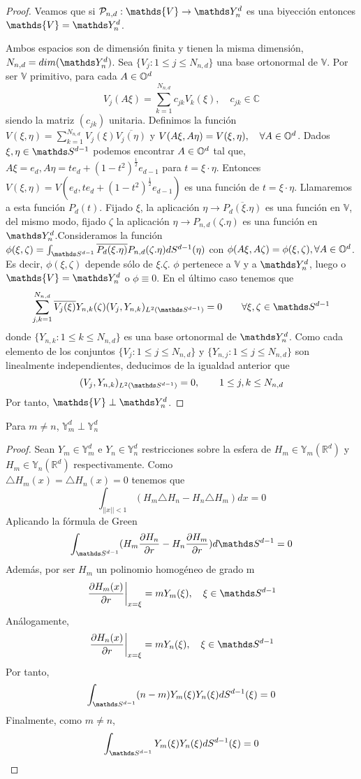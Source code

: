\begin{proof}
Veamos que si $\mathcal{P}_{n,d}:\mathds{V} \to \spharm$ es una biyección entonces\\ $\mathds{V}=\spharm$.
\medskip

Ambos espacios son de dimensión finita y tienen la misma dimensión, $N_{n,d}=dim(\spharm)$. Sea $\{V_j : 1 \le j \le N_{n,d} \}$ una base ortonormal de  $\mathds{V}$. Por ser $\mathds{V}$ primitivo, para cada $A\in\mathbb{O}^d$ $$
V_j(A\xi) = \sum_{k=1}^{N_{n,d}}c_{jk}V_k(\xi), \quad c_{jk}\in\mathds{C}$$ siendo la matriz $(c_{jk})$ unitaria. Definimos la función \\$V(\xi,\eta) = \sum_{k=1}^{N_{n,d}}V_j(\xi)\overline{V_j(\eta)}$
y $V(A\xi,A\eta) = V(\xi,\eta), \quad \forall A \in \mathbb{O}^d$.
Dados $\xi,\eta \in \sphere$ podemos encontrar $A\in\mathbb{O}^d$ tal que, $A\xi=e_d, A\eta = te_d + (1-t^2)^{\frac{1}{2}}e_{d-1}$ para $t=\xi\cdot\eta$. Entonces $V(\xi,\eta) = V(e_d, te_d + (1-t^2)^{\frac{1}{2}}e_{d-1})$ es una función de $t=\xi\cdot\eta$. Llamaremos a esta función $P_d(t)$. Fijado $\xi$, la aplicación $\eta \to \overline{P_d(\xi.\eta)}$ es una función en $\mathds{V}$, del mismo modo, fijado $\zeta$ la aplicación $\eta \to P_{n,d}(\zeta.\eta)$ es una función en $\spharm$.Consideramos la función $\phi(\xi,\zeta) = \sphint \overline{P_d(\xi.\eta)}P_{n,d}(\zeta.\eta)dS^{d-1}(\eta)$ con $\phi(A\xi,A\zeta)= \phi(\xi,\zeta), \forall A\in\mathbb{O}^d$. Es decir, $\phi(\xi,\zeta)$ depende sólo de $\xi.\zeta$. $\phi$ pertenece a $\mathds{V}$ y a $\spharm$, luego o $\mathds{V} = \spharm$ o $\phi \equiv 0$. En el último caso tenemos que $$
\sum_{j,k=1}^{N_{n,d}} \overline{V_j(\xi)}Y_{n,k}(\zeta)(V_j,Y_{n,k})_{L^2(\sphere)}=0 \qquad \forall\xi,\zeta \in \sphere
$$ donde $\{Y_{n,k}:1\le k\le N_{n,d}\}$ es una base ortonormal de $\spharm$. Como cada elemento de los conjuntos $\{V_j : 1\le j\le N_{n,d}\}$ y $\{Y_{n,j}:1\le j\le N_{n,d}\}$ son linealmente independientes, deducimos de la igualdad anterior que $$
(V_j,Y_{n,k})_{L^2(\sphere)} = 0, \qquad 1 \le j,k \le N_{n,d} $$
 Por tanto, $\mathds{V} \perp \spharm$.
\end{proof}
\begin{cor}Para $m\neq n$, $\mathds{Y}_m^d \perp \mathds{Y}_n^d$
\end{cor}
\begin{proof}Sean $Y_m \in \mathds{Y}_m^d$ e  $Y_n \in \mathds{Y}_n^d$ restricciones sobre la esfera de  $H_m \in \mathds{Y}_m(\mathds{R}^d)$ y $H_m \in \mathds{Y}_n(\mathds{R}^d)$ respectivamente. Como \\$\triangle H_m(x) = \triangle H_n(x) = 0$ tenemos que $$
	\int_{||x||< 1}(H_m\triangle H_n-H_n\triangle H_m)dx = 0
	$$
Aplicando la fórmula de Green$$
\int_{\sphere}(H_m \frac{\partial H_n}{\partial r} - H_n \frac{\partial H_m}{\partial r}) d\sphere = 0$$
Además, por ser $H_m$ un polinomio homogéneo de grado m $$
\left.\frac{\partial H_m(x)}{\partial r}\right|_{x=\xi} = m Y_m(\xi),\quad \xi\in\sphere$$
Análogamente,
$$
\left.\frac{\partial H_n(x)}{\partial r}\right|_{x=\xi} = m Y_n(\xi),\quad \xi\in\sphere 
$$
Por tanto, $$
\sphint (n-m)Y_m(\xi)Y_n(\xi)dS^{d-1}(\xi) = 0
$$
Finalmente, como $m\neq n$, $$
\sphint Y_m(\xi)Y_n(\xi)dS^{d-1}(\xi) = 0
$$
\end{proof}
